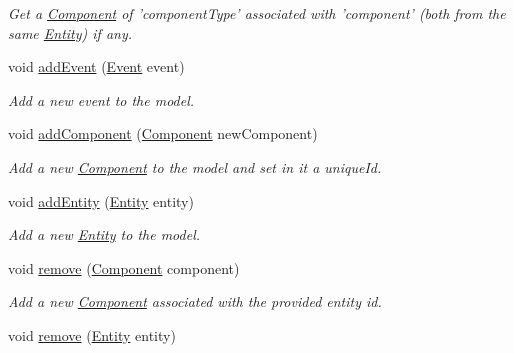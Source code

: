 \begin{DoxyCompactItemize}
\begin{DoxyCompactList}\small\item\em Get a \hyperlink{classbr_1_1unb_1_1unbomber_1_1core_1_1_component}{Component} of 'component\+Type' associated with 'component' (both from the same \hyperlink{classbr_1_1unb_1_1unbomber_1_1core_1_1_entity}{Entity}) if any. \end{DoxyCompactList}\item 
void \hyperlink{interfacebr_1_1unb_1_1unbomber_1_1core_1_1_entity_manager_a69e02eb48573d8c896f71655dd6bac9e}{add\+Event} (\hyperlink{classbr_1_1unb_1_1unbomber_1_1core_1_1_event}{Event} event)
\begin{DoxyCompactList}\small\item\em Add a new event to the model. \end{DoxyCompactList}\item 
void \hyperlink{interfacebr_1_1unb_1_1unbomber_1_1core_1_1_entity_manager_a5c4a7fbf7436addc6b9b931a8cabda0d}{add\+Component} (\hyperlink{classbr_1_1unb_1_1unbomber_1_1core_1_1_component}{Component} new\+Component)
\begin{DoxyCompactList}\small\item\em Add a new \hyperlink{classbr_1_1unb_1_1unbomber_1_1core_1_1_component}{Component} to the model and set in it a unique\+Id. \end{DoxyCompactList}\item 
void \hyperlink{interfacebr_1_1unb_1_1unbomber_1_1core_1_1_entity_manager_a3d1b44e3fd90157e90f547f6b3fb91c8}{add\+Entity} (\hyperlink{classbr_1_1unb_1_1unbomber_1_1core_1_1_entity}{Entity} entity)
\begin{DoxyCompactList}\small\item\em Add a new \hyperlink{classbr_1_1unb_1_1unbomber_1_1core_1_1_entity}{Entity} to the model. \end{DoxyCompactList}\item 
void \hyperlink{interfacebr_1_1unb_1_1unbomber_1_1core_1_1_entity_manager_a11f3fdc9cec412f09db2a68a289d32a8}{remove} (\hyperlink{classbr_1_1unb_1_1unbomber_1_1core_1_1_component}{Component} component)
\begin{DoxyCompactList}\small\item\em Add a new \hyperlink{classbr_1_1unb_1_1unbomber_1_1core_1_1_component}{Component} associated with the provided entity id. \end{DoxyCompactList}\item 
void \hyperlink{interfacebr_1_1unb_1_1unbomber_1_1core_1_1_entity_manager_a20cd85dcff1aa66284abdc5da4dbc451}{remove} (\hyperlink{classbr_1_1unb_1_1unbomber_1_1core_1_1_entity}{Entity} entity)

\end{DoxyCompactItemize}
